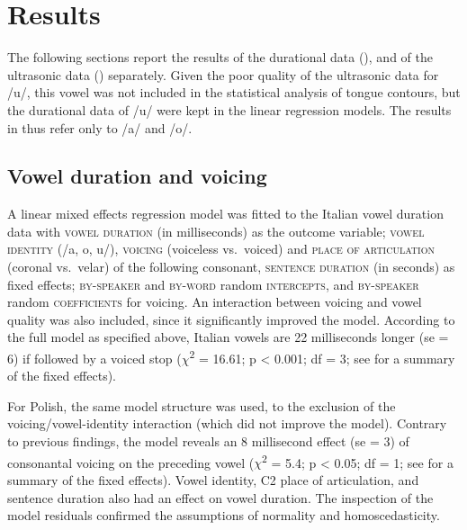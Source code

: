 \documentclass[authoryear, twocolumn]{elsarticle}
\begin{document}
\section{Results}\label{results}

The following sections report the results of the durational data
(), and of the ultrasonic data ()
separately. Given the poor quality of the ultrasonic data for /u/, this
vowel was not included in the statistical analysis of tongue contours,
but the durational data of /u/ were kept in the linear regression
models. The results in  thus refer only to /a/ and /o/.

\subsection{Vowel duration and
voicing}\label{vowel-duration-and-voicing}

\label{s:vow-duration}

A linear mixed effects regression model was fitted to the Italian vowel
duration data with \textsc{vowel duration} (in milliseconds) as the
outcome variable; \textsc{vowel identity} (/a, o, u/), \textsc{voicing}
(voiceless vs.~voiced) and \textsc{place of articulation} (coronal
vs.~velar) of the following consonant, \textsc{sentence duration} (in
seconds) as fixed effects; \textsc{by-speaker} and \textsc{by-word}
random \textsc{intercepts}, and \textsc{by-speaker} random
\textsc{coefficients} for voicing. An interaction between voicing and
vowel quality was also included, since it significantly improved the
model. According to the full model as specified above, Italian vowels
are 22 milliseconds longer (se = 6) if followed by a voiced stop
(\(\chi\)\textsuperscript{2} = 16.61; p \textless{} 0.001; df = 3; see
 for a summary of the fixed effects).

For Polish, the same model structure was used, to the exclusion of the
voicing/vowel-identity interaction (which did not improve the model).
Contrary to previous findings, the model reveals an 8 millisecond effect
(se = 3) of consonantal voicing on the preceding vowel
(\(\chi\)\textsuperscript{2} = 5.4; p \textless{} 0.05; df = 1; see
 for a summary of the fixed effects). Vowel
identity, C2 place of articulation, and sentence duration also had an
effect on vowel duration. The inspection of the model residuals
confirmed the assumptions of normality and homoscedasticity.
\end{document}
